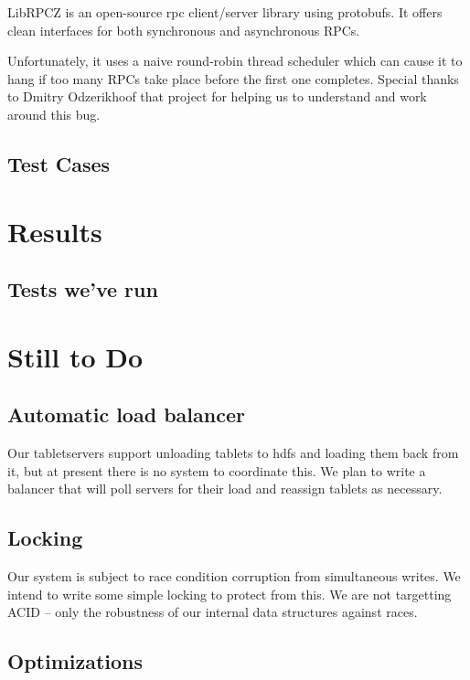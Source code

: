 \documentclass[11pt]{article}
\begin{document}
LibRPCZ is an open-source rpc client/server library using protobufs. It offers clean interfaces for both synchronous and asynchronous RPCs.

Unfortunately, it uses a naive round-robin thread scheduler which can cause it to hang if too many RPCs take place before the first one completes. Special thanks to Dmitry Odzerikhoof that project for helping us to understand and work around this bug.

\subsection{Test Cases}

\section{Results}

\subsection{Tests we've run}

\section{Still to Do}

\subsection{Automatic load balancer}

Our tabletservers support unloading tablets to hdfs and loading them back from it, but at present there is no system to coordinate this. We plan to write a balancer that will poll servers for their load and reassign tablets as necessary.

\subsection{Locking}

Our system is subject to race condition corruption from simultaneous writes. We intend to write some simple locking to protect from this. We are not targetting ACID -- only the robustness of our internal data structures against races.

\subsection{Optimizations}
\end{document}
